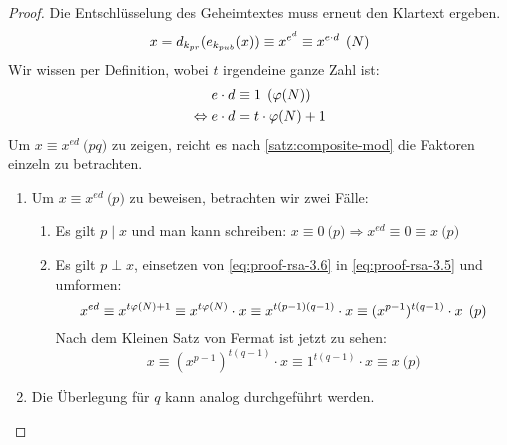 \begin{proof}
  Die Entschlüsselung des Geheimtextes muss erneut den Klartext ergeben.
  \begin{equation}
    \label{eq:proof-rsa-3.5}
    x = d_{k_{pr}}(e_{k_{pub}}(x)) \equiv x^{e^d} \equiv x^{e \cdot d} \pod{N}
  \end{equation}
  Wir wissen per Definition, wobei $t$ irgendeine ganze Zahl ist:
  \begin{align}
    e \cdot d                 & \equiv 1 \pod{\varphi(N)} \notag \\
    \label{eq:proof-rsa-3.6}
    \Leftrightarrow e \cdot d & = t \cdot \varphi(N) + 1
  \end{align}
  Um $x \equiv x^{ed} \pod{pq}$ zu zeigen, reicht es nach \autoref{satz:composite-mod}
  die Faktoren einzeln zu betrachten.
  \begin{enumerate}
    \item Um $x \equiv x^{ed} \pod{p}$ zu beweisen, betrachten wir zwei Fälle:
          \begin{enumerate}[topsep=0pt]
            \item Es gilt $p \mid x$ und man kann schreiben:
                  $x \equiv 0 \pod{p} \Rightarrow x^{ed} \equiv 0 \equiv x \pod{p}$
            \item Es gilt $p \perp x$, einsetzen von \eqref{eq:proof-rsa-3.6} in
                  \eqref{eq:proof-rsa-3.5}
                  und umformen:
                  \begin{equation*}
                    x^{ed} \equiv x^{t\varphi(N) + 1} \equiv
                    x^{t\varphi(N)} \cdot x \equiv
                    x^{t(p - 1)(q - 1)} \cdot x \equiv
                    (x^{p - 1})^{t(q - 1)} \cdot x \pod{p}
                  \end{equation*}
                  Nach dem Kleinen Satz von Fermat ist jetzt zu sehen:
                  \begin{equation*}
                    x \equiv (x^{p - 1})^{t(q - 1)} \cdot x \equiv
                    1^{t(q - 1)} \cdot x \equiv x \pod{p}
                  \end{equation*}
          \end{enumerate}
    \item Die Überlegung für $q$ kann analog durchgeführt werden.
  \end{enumerate}
\end{proof}

